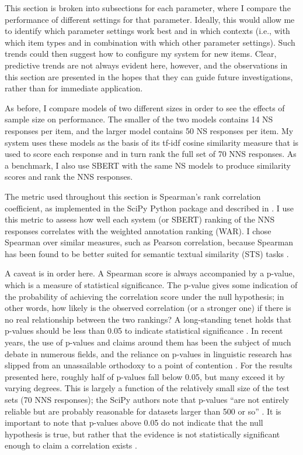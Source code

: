 This section is broken into subsections for each parameter, where I compare the performance of different settings for that parameter. Ideally, this would allow me to identify which parameter settings work best and in which contexts (i.e., with which item types and in combination with which other parameter settings). Such trends could then suggest how to configure my system for new items. Clear, predictive trends are not always evident here, however, and the observations in this section are presented in the hopes that they can guide future investigations, rather than for immediate application.

As before, I compare models of two different sizes in order to see the effects of sample size on performance. The smaller of the two models contains 14 NS responses per item, and the larger model contains 50 NS responses per item. My system uses these models as the basis of its tf-idf cosine similarity measure that is used to score each response and in turn rank the full set of 70 NNS responses. As a benchmark, I also use SBERT with the same NS models to produce similarity scores and rank the NNS responses.

The metric used throughout this section is Spearman's rank correlation coefficient, as implemented in the SciPy Python package \cite{2020scipy} and described in \citet{zwillinger1999crc}. I use this metric to assess how well each system (or SBERT) ranking of the NNS responses correlates with the weighted annotation ranking (WAR). I chose Spearman over similar measures, such as Pearson correlation, because Spearman has been found to be better suited for semantic textual similarity (STS) tasks \cite{reimers2016}.

A caveat is in order here. A Spearman score is always accompanied by a p-value, which is a measure of statistical significance. The p-value gives some indication of the probability of achieving the correlation score under the null hypothesis; in other words, how likely is the observed correlation (or a stronger one) if there is no real relationship between the two rankings? A long-standing tenet holds that p-values should be less than 0.05 to indicate statistical significance \cite{zar1972significance}. In recent years, the use of p-values and claims around them has been the subject of much debate in numerous fields, and the reliance on p-values in linguistic research has slipped from an unassailable orthodoxy to a point of contention \cite{moran2012revisiting, tomczak2014need}. For the results presented here, roughly half of p-values fall below 0.05, but many exceed it by varying degrees. This is largely a function of the relatively small size of the test sets (70 NNS responses); the SciPy authors note that p-values ``are not entirely reliable but are probably reasonable for datasets larger than 500 or so'' \cite{2020scipy}. It is important to note that p-values above 0.05 do not indicate that the null hypothesis is true, but rather that the evidence is not statistically significant enough to claim a correlation exists \cite{vasishth2016statistical}.

